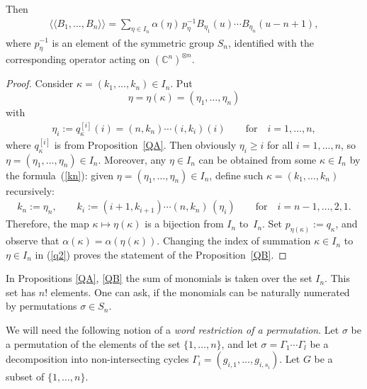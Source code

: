 \documentclass[pdftex]{sigma}
\newcommand{\CC}{\mathbb C}    %
\begin{document}
\begin{proposition}\label{QB}
 Then
\begin{gather*}%
\langle \langle B_1,\dots, B_n\rangle \rangle
=\sum_{ \eta\in I_n }\alpha{( \eta)}\,p_\eta^{-1}B_{ \eta_1}(u)\cdots B_{ \eta_n}(u-n+1),
\end{gather*}
where $p_\eta^{-1}$   is an  element of the symmetric group $S_n$, identified with the corresponding operator acting on $(\CC^n)^{\otimes n}$.
 \end{proposition}

\begin{proof}
Consider $\kappa=(k_1, \dots, k_n)\in I_n$.  Put
\[
\eta=\eta(\kappa)=(\eta_1, \dots, \eta_n)
\] with
\begin{gather}\label{kn}
\eta_i:=q_{\kappa}^{[i]}(i)=(n,k_n)\cdots (i, k_i) (i)  \qquad\text{for}\quad  i=1,\dots, n,
\end{gather}
where $q_{\kappa}^{[i]}$ is from Proposition~\ref{QA}.
Then obviously $\eta_i\!\ge\! i$ for all $i=1, \dots, n$, so \mbox{$\eta\!=\!(\eta_1, \dots, \eta_n)\!\in\! I_n$}. Moreover, any $\eta\in I_n$ can be obtained from some $\kappa \in I_n$ by the formula~(\ref{kn}): given $\eta=(\eta_1, \dots, \eta_n)\in I_n$, def\/ine  such $\kappa=(k_1, \dots, k_n)$ recursively:
\begin{gather*}
k_n:= \eta_n,\qquad
k_i:= (i+1,k_{i+1})\cdots (n, k_n)\,(\eta_i)\qquad \text{for}\quad i=n-1,\dots, 2,1.
\end{gather*}
Therefore, the map $\kappa\mapsto \eta(\kappa)$ is a bijection from $I_n$ to~$I_n$. Set $p_{\eta(\kappa)}:=q_\kappa$, and  observe that $\alpha(\kappa)= \alpha (\eta(\kappa))$. Changing the index of summation $\kappa \in I_n$ to  $\eta \in I_n$ in  (\ref{q2}) proves the statement  of the Proposition~\ref{QB}.
\end{proof}

In Propositions \ref{QA},  \ref{QB} the sum of monomials  is taken over the set $I_n$. This set   has  $n!$ elements. One can ask, if the monomials can be  naturally numerated by permutations  $\sigma\in S_n$.

We will need the following notion of a {\it word restriction of a permutation}.
 Let $\sigma$  be a permutation of the elements of the set $\{1, \dots, n\}$, and let $\sigma=\Gamma_1\cdots \Gamma_l$ be a decomposition  into non-intersecting cycles $\Gamma_i=(g_{i,1},\dots, g_{i,s_i})$.  Let $G$ be a subset of $\{1, \dots, n\}$.
\end{document}
